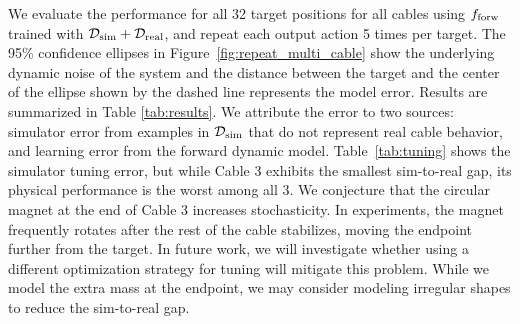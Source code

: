\documentclass[letterpaper, 10 pt, conference]{ieeeconf}  %
\newcommand{\remark}[3]{{\color{#2}[#1: #3]}}
\newcommand{\daniel}[1]{\remark{Daniel}{blue}{#1}}
\newcommand{\Lawrence}[1]{\remark{Lawrence}{orange}{#1}}
\newcommand{\jeffi}[1]{\remark{JI}{red}{#1}}
\begin{document}

We evaluate the performance for all 32 target positions for all cables using $f_{\rm forw}$ trained with $\mathcal{D}_{\rm sim} + \mathcal{D}_{\rm real}$, and repeat each output action 5 times per target.
The 95\% confidence ellipses in Figure~\ref{fig:repeat_multi_cable} show the underlying dynamic noise of the system and the distance between the target and the center of the ellipse shown by the dashed line represents the model error. Results are summarized in Table \ref{tab:results}. We attribute the error to two sources: simulator error from examples in $\mathcal{D}_{\rm sim}$ that do not represent real cable behavior, and learning error from the forward dynamic model. Table~\ref{tab:tuning} shows the simulator tuning error, but while Cable 3 exhibits the smallest sim-to-real gap, its physical performance is the worst among all 3. We conjecture that the circular magnet at the end of Cable 3 increases stochasticity. In experiments, the magnet frequently rotates after the rest of the cable stabilizes, moving the endpoint further from the target. In future work, we will investigate whether using a different optimization strategy for tuning will mitigate this problem. While we model the extra mass at the endpoint, we may consider modeling irregular shapes to reduce the sim-to-real gap. 

\end{document}
